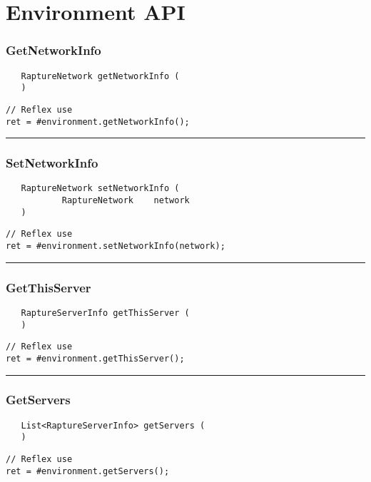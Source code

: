 \section{Environment API}

\subsubsection{GetNetworkInfo}
\label{Api:GetNetworkInfo}
\begin{verbatim}
   RaptureNetwork getNetworkInfo (
   )
\end{verbatim}
\begin{lstlisting}[language=reflex]
// Reflex use
ret = #environment.getNetworkInfo();
\end{lstlisting}



\rule{15cm}{2pt}
\subsubsection{SetNetworkInfo}
\label{Api:SetNetworkInfo}
\begin{verbatim}
   RaptureNetwork setNetworkInfo (
           RaptureNetwork    network
   )
\end{verbatim}
\begin{lstlisting}[language=reflex]
// Reflex use
ret = #environment.setNetworkInfo(network);
\end{lstlisting}



\rule{15cm}{2pt}
\subsubsection{GetThisServer}
\label{Api:GetThisServer}
\begin{verbatim}
   RaptureServerInfo getThisServer (
   )
\end{verbatim}
\begin{lstlisting}[language=reflex]
// Reflex use
ret = #environment.getThisServer();
\end{lstlisting}



\rule{15cm}{2pt}
\subsubsection{GetServers}
\label{Api:GetServers}
\begin{verbatim}
   List<RaptureServerInfo> getServers (
   )
\end{verbatim}
\begin{lstlisting}[language=reflex]
// Reflex use
ret = #environment.getServers();
\end{lstlisting}



